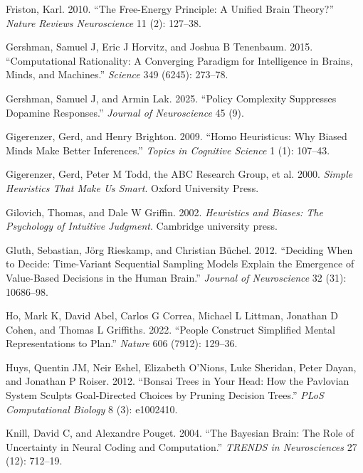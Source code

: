 \documentclass[
  letterpaper,
  DIV=11,
  numbers=noendperiod]{scrartcl}
\newlength{\cslhangindent}
\newenvironment{CSLReferences}[2] %
 {\begin{list}{}{%
  \setlength{\itemindent}{0pt}
  \setlength{\leftmargin}{0pt}
  \setlength{\parsep}{0pt}
  \ifodd #1
   \setlength{\leftmargin}{\cslhangindent}
   \setlength{\itemindent}{-1\cslhangindent}
  \fi
  \setlength{\itemsep}{#2\baselineskip}}}
 {\end{list}}
\begin{document}
\begin{CSLReferences}{1}{1}
Friston, Karl. 2010. {``The Free-Energy Principle: A Unified Brain
Theory?''} \emph{Nature Reviews Neuroscience} 11 (2): 127--38.

Gershman, Samuel J, Eric J Horvitz, and Joshua B Tenenbaum. 2015.
{``Computational Rationality: A Converging Paradigm for Intelligence in
Brains, Minds, and Machines.''} \emph{Science} 349 (6245): 273--78.

Gershman, Samuel J, and Armin Lak. 2025. {``Policy Complexity Suppresses
Dopamine Responses.''} \emph{Journal of Neuroscience} 45 (9).

Gigerenzer, Gerd, and Henry Brighton. 2009. {``Homo Heuristicus: Why
Biased Minds Make Better Inferences.''} \emph{Topics in Cognitive
Science} 1 (1): 107--43.

{Gigerenzer, Gerd, Peter M Todd, the ABC Research Group, et al.} 2000.
\emph{Simple Heuristics That Make Us Smart}. Oxford University Press.

Gilovich, Thomas, and Dale W Griffin. 2002. \emph{Heuristics and Biases:
The Psychology of Intuitive Judgment}. Cambridge university press.

Gluth, Sebastian, Jörg Rieskamp, and Christian Büchel. 2012. {``Deciding
When to Decide: Time-Variant Sequential Sampling Models Explain the
Emergence of Value-Based Decisions in the Human Brain.''} \emph{Journal
of Neuroscience} 32 (31): 10686--98.

Ho, Mark K, David Abel, Carlos G Correa, Michael L Littman, Jonathan D
Cohen, and Thomas L Griffiths. 2022. {``People Construct Simplified
Mental Representations to Plan.''} \emph{Nature} 606 (7912): 129--36.

Huys, Quentin JM, Neir Eshel, Elizabeth O'Nions, Luke Sheridan, Peter
Dayan, and Jonathan P Roiser. 2012. {``Bonsai Trees in Your Head: How
the Pavlovian System Sculpts Goal-Directed Choices by Pruning Decision
Trees.''} \emph{PLoS Computational Biology} 8 (3): e1002410.

Knill, David C, and Alexandre Pouget. 2004. {``The Bayesian Brain: The
Role of Uncertainty in Neural Coding and Computation.''} \emph{TRENDS in
Neurosciences} 27 (12): 712--19.


\end{CSLReferences}
\end{document}
